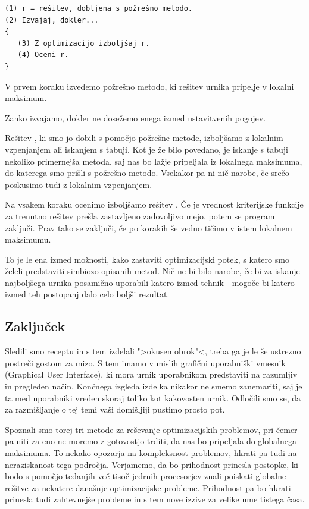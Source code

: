 \documentclass[10pt,a4paper]{article}
\begin{document}
\begin{verbatim}
(1) r = rešitev, dobljena s požrešno metodo.
(2) Izvajaj, dokler...
{
   (3) Z optimizacijo izboljšaj r.
   (4) Oceni r.
}

\end{verbatim}

   V prvem koraku izvedemo požrešno metodo, ki rešitev urnika pripelje v lokalni maksimum.

   Zanko izvajamo, dokler ne dosežemo enega izmed ustavitvenih pogojev.

   Rešitev , ki smo jo dobili s pomočjo požrešne metode, izboljšamo z lokalnim vzpenjanjem
   ali iskanjem s tabuji. Kot je že bilo povedano, je iskanje s tabuji nekoliko primernejša metoda,
   saj nas bo lažje pripeljala iz lokalnega maksimuma, do katerega smo prišli s požrešno metodo.
   Vsekakor pa ni nič narobe, če srečo poskusimo tudi z lokalnim vzpenjanjem.

   Na vsakem koraku ocenimo izboljšamo rešitev . Če je vrednost kriterijske funkcije
   za trenutno rešitev prešla zastavljeno zadovoljivo mejo, potem se program zaključi. Prav tako
   se zaključi, če po  korakih še vedno tičimo v istem lokalnem maksimumu.

To je le ena izmed možnosti, kako zastaviti optimizacijski potek, s katero smo želeli predstaviti
simbiozo opisanih metod. Nič ne bi bilo narobe, če bi za iskanje najboljšega urnika posamično
uporabili katero izmed tehnik - mogoče bi katero izmed teh postopanj dalo celo boljši rezultat.

\subsection{Zaključek} %

Sledili smo receptu in s tem izdelali ">okusen obrok"<, treba ga je le še ustrezno postreči
gostom za mizo. S tem imamo v mislih grafični uporabniški vmesnik (Graphical
User Interface), ki mora urnik uporabnikom predstaviti na razumljiv in
pregleden način. Končnega izgleda izdelka nikakor ne smemo zanemariti, saj je ta med uporabniki
vreden skoraj toliko kot kakovosten urnik. Odločili smo se, da za razmišljanje o tej temi vaši
domišljiji pustimo prosto pot.

Spoznali smo torej tri metode za reševanje optimizacijskih problemov, pri čemer pa niti za eno
ne moremo z gotovostjo trditi, da nas bo pripeljala do globalnega maksimuma. To nekako opozarja
na kompleksnost problemov, hkrati pa tudi na neraziskanost tega področja. Verjamemo, da bo
prihodnost prinesla postopke, ki bodo s pomočjo tedanjih več tisoč-jedrnih procesorjev znali
poiskati globalne rešitve za nekatere današnje optimizacijske probleme. Prihodnost pa bo
hkrati prinesla tudi zahtevnejše probleme in s tem nove izzive za velike ume tistega časa.
\end{document}
